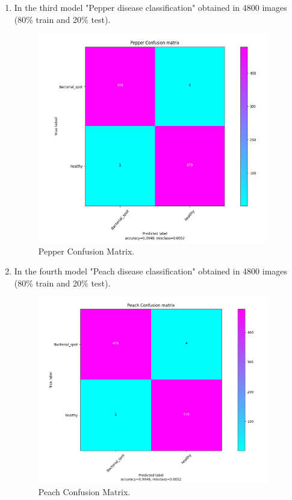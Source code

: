 \begin{enumerate}
  \item In the third model "Pepper disease classification" obtained in 4800 images (80\% train and 20\% test).
    \begin{figure}[H]
      \centering
      \includegraphics[width=10cm]{photos/chapter05/11.png}
      \caption{Pepper Confusion Matrix.}
    \end{figure}

  \item In the fourth model "Peach disease classification" obtained in 4800 images (80\% train and 20\% test).
    \begin{figure}[H]
      \centering
      \includegraphics[width=10cm]{photos/chapter05/12.png}
      \caption{Peach Confusion Matrix.}
    \end{figure}


\end{enumerate}
